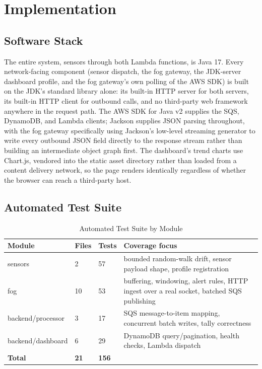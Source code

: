 \documentclass[conference]{IEEEtran}
\begin{document}
\section{Implementation}

\subsection{Software Stack}

The entire system, sensors through both Lambda functions, is Java 17. Every network-facing component (sensor dispatch, the fog gateway, the JDK-server dashboard profile, and the fog gateway's own polling of the AWS SDK) is built on the JDK's standard library alone: its built-in HTTP server for both servers, its built-in HTTP client for outbound calls, and no third-party web framework anywhere in the request path. The AWS SDK for Java v2 supplies the SQS, DynamoDB, and Lambda clients; Jackson supplies JSON parsing throughout, with the fog gateway specifically using Jackson's low-level streaming generator to write every outbound JSON field directly to the response stream rather than building an intermediate object graph first. The dashboard's trend charts use Chart.js, vendored into the static asset directory rather than loaded from a content delivery network, so the page renders identically regardless of whether the browser can reach a third-party host.

\subsection{Automated Test Suite}

\begin{table}[!t]
\caption{Automated Test Suite by Module}
\label{tab:tests}
\centering
\footnotesize
\begin{tabular}{p{0.85in}p{0.28in}p{0.28in}p{1.5in}}
\hline
\textbf{Module} & \textbf{Files} & \textbf{Tests} & \textbf{Coverage focus} \\
\hline
sensors & 2 & 57 & bounded random-walk drift, sensor payload shape, profile registration \\
fog & 10 & 53 & buffering, windowing, alert rules, HTTP ingest over a real socket, batched SQS publishing \\
backend/processor & 3 & 17 & SQS message-to-item mapping, concurrent batch writes, tally correctness \\
backend/dashboard & 6 & 29 & DynamoDB query/pagination, health checks, Lambda dispatch \\
\hline
\textbf{Total} & \textbf{21} & \textbf{156} & \\
\hline
\end{tabular}
\end{table}
\end{document}
